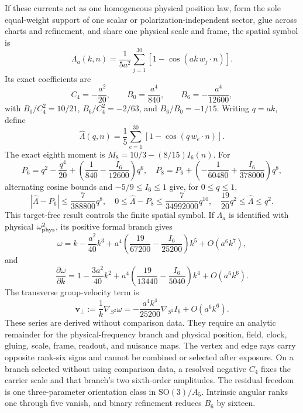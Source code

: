 \documentclass[10pt]{article}
\begin{document}
If these currents act as one homogeneous physical position law, form the sole
equal-weight support of one scalar or polarization-independent sector, glue
across charts and refinement, and share one physical scale and frame, the
spatial symbol is
\[
 \Lambda_a(k,n)=\frac{1}{5a^2}\sum_{j=1}^{30}
 \left[1-\cos\!\left(ak\,w_j\!\cdot n\right)\right].
\]
Its exact coefficients are
\[
 C_4=-\frac{a^2}{20},\qquad B_0=\frac{a^4}{840},\qquad
 B_6=-\frac{a^4}{12600},
\]
with \(B_0/C_4^2=10/21\), \(B_6/C_4^2=-2/63\), and
\(B_6/B_0=-1/15\). Writing \(q=ak\), define
\[
 \widehat\Lambda(q,n)=\frac15\sum_{e=1}^{30}
   [1-\cos(q\,w_e\mathbin{\cdot}n)].
\]
The exact eighth moment is \(M_8=10/3-(8/15)I_6(n)\). For
\[
 P_6=q^2-\frac{q^4}{20}
   +\left(\frac1{840}-\frac{I_6}{12600}\right)q^6,
 \quad
 P_8=P_6+\left(-\frac1{60480}+\frac{I_6}{378000}\right)q^8,
\]
alternating cosine bounds and \(-5/9\le I_6\le1\) give, for
\(0\le q\le1\),
\[
 |\widehat\Lambda-P_6|\le\frac7{388800}q^8,
 \quad 0\le\widehat\Lambda-P_8\le\frac7{34992000}q^{10},
 \quad \frac{19}{20}q^2\le\widehat\Lambda\le q^2.
\]
This target-free result controls the finite spatial symbol. If
\(\Lambda_a\) is identified with physical
\(\omega_{\rm phys}^2\), its positive formal branch gives
\[
 \omega=k-\frac{a^2}{40}k^3
 +a^4\left(\frac{19}{67200}-\frac{I_6}{25200}\right)k^5
 +O(a^6k^7),
\]
and
\[
 \frac{\partial\omega}{\partial k}=1-\frac{3a^2}{40}k^2
 +a^4\left(\frac{19}{13440}-\frac{I_6}{5040}\right)k^4
 +O(a^6k^6).
\]
The transverse group-velocity term is
\[
 \mathbf v_\perp:=\frac1k\nabla_{S^2}\omega
 =-\frac{a^4k^4}{25200}\nabla_{S^2}I_6+O(a^6k^6).
\]
These series are derived without comparison data. They require an analytic
remainder for the physical-frequency branch and physical position,
field, clock, gluing, scale, frame, readout, and nuisance maps. The vertex and
edge rays carry
opposite rank-six signs and cannot be combined or selected after exposure.
On a branch selected without using comparison data, a resolved negative
\(C_4\) fixes the carrier scale and that branch's two sixth-order amplitudes.
The residual freedom is one three-parameter orientation class in
\(\mathrm{SO}(3)/A_5\). Intrinsic angular ranks one through five vanish, and
binary refinement reduces \(B_6\) by sixteen.
\end{document}
